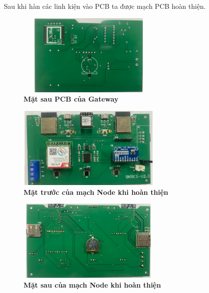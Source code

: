 \documentclass{article} %
\begin{document}
	\newpage
	Sau khi hàn các linh kiện vào PCB ta được mạch PCB hoàn thiện.
	\begin{figure}[!ht]
		\centering
		\includegraphics[width=7cm,height=4cm]{Images/mtGatebot.png}
		\caption[  Mặt sau PCB của Gateway ]{\bfseries \fontsize{12pt}{0pt}\selectfont Mặt sau PCB của Gateway}
		\label{GatePCBbot}
	\end{figure}
	
	\begin{figure}[!ht]
		\centering
		\includegraphics[width=7cm,height=4cm]{Images/NodeHtTop.png}
		\caption[   Mặt trước của mạch Node khi hoàn thiện ]{\bfseries \fontsize{12pt}{0pt}\selectfont  Mặt trước của mạch Node khi hoàn thiện}
		\label{NodeHtTop}
	\end{figure}
	\begin{figure}[!ht]
		\centering
		\includegraphics[width=7cm,height=4cm]{Images/NodeHtbot.png}
		\caption[   Mặt sau của mạch Node  khi hoàn thiện ]{\bfseries \fontsize{12pt}{0pt}\selectfont  Mặt sau của mạch Node khi hoàn thiện}
		\label{NodeHtbot}
	\end{figure}
	
\end{document}
